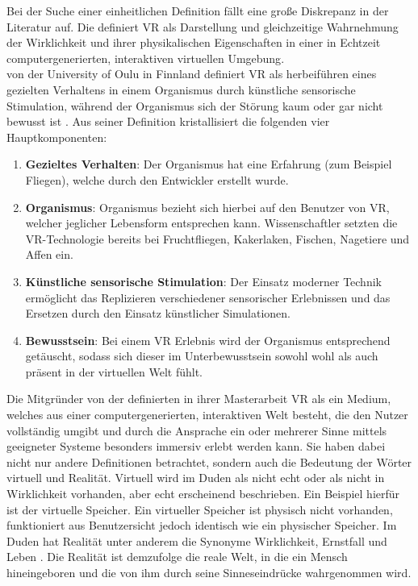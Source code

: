 Bei der Suche einer einheitlichen Definition fällt eine große Diskrepanz in der Literatur auf. Die \citeauthor{BundeszentralefurpolitischeBildung.2018} definiert \ac{VR} als \glqq Darstellung und gleichzeitige Wahrnehmung der Wirklichkeit und ihrer physikalischen Eigenschaften in einer in Echtzeit computergenerierten, interaktiven virtuellen Umgebung\grqq  \cite{BundeszentralefurpolitischeBildung.2018}. \\
\citeauthor{LaValle.2019} von der University of Oulu in Finnland definiert \ac{VR} als herbeiführen eines gezielten Verhaltens in einem Organismus durch künstliche sensorische Stimulation, während der Organismus sich der Störung kaum oder gar nicht bewusst ist \cite{LaValle.2019}. Aus seiner Definition kristallisiert \citeauthor{LaValle.2019} die folgenden vier Hauptkomponenten:\cite{LaValle.2019}
\begin{enumerate}
	\item \textbf{Gezieltes Verhalten}: Der Organismus hat eine Erfahrung (zum Beispiel Fliegen), welche durch den Entwickler erstellt wurde. 
	\item \textbf{Organismus}: Organismus bezieht sich hierbei auf den Benutzer von \ac{VR}, welcher jeglicher Lebensform entsprechen kann. Wissenschaftler setzten die \ac{VR}-Technologie bereits bei Fruchtfliegen, Kakerlaken, Fischen, Nagetiere und Affen ein. 
	\item \textbf{Künstliche sensorische Stimulation}: Der Einsatz moderner Technik ermöglicht das Replizieren verschiedener sensorischer Erlebnissen und das Ersetzen durch den Einsatz künstlicher Simulationen. 
	\item \textbf{Bewusstsein}: Bei einem \acl{VR} Erlebnis wird der Organismus entsprechend getäuscht, sodass sich dieser im Unterbewusstsein sowohl wohl als auch präsent in der virtuellen Welt fühlt.
\end{enumerate}

Die Mitgründer von der   definierten in ihrer Masterarbeit \ac{VR} als \glqq ein Medium, welches aus einer computergenerierten, interaktiven Welt besteht, die den Nutzer vollständig umgibt und durch die Ansprache ein oder mehrerer Sinne mittels geeigneter Systeme besonders immersiv erlebt werden kann\grqq \cite{omnia.2017}. Sie haben dabei nicht nur andere Definitionen betrachtet, sondern auch die Bedeutung der Wörter virtuell und Realität. Virtuell wird im Duden als \glqq nicht echt \grqq \cite{DudenVirtuell} oder als \glqq nicht in Wirklichkeit vorhanden, aber echt erscheinend\grqq \cite{DudenVirtuell} beschrieben. Ein Beispiel hierfür ist der virtuelle Speicher. Ein virtueller Speicher ist physisch nicht vorhanden, funktioniert aus Benutzersicht jedoch identisch wie ein physischer Speicher. Im Duden hat Realität unter anderem die Synonyme Wirklichkeit, Ernstfall und Leben \cite{DudenRealitaet}. Die Realität ist demzufolge \glqq die reale Welt, in die ein Mensch hineingeboren und die von ihm durch seine Sinneseindrücke wahrgenommen wird\grqq \cite{omnia.2017}.

